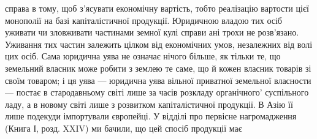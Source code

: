 справа в тому, щоб з’ясувати економічну вартість, тобто реалізацію вартости
цієї монополії на базі капіталістичної продукції. Юридичною владою тих осіб
уживати чи зловживати частинами земної кулі справи ані трохи не розв’язано.
Уживання тих частин залежить цілком від економічних умов, незалежних від
волі цих осіб. Сама юридична уява не означає нічого більше, як тільки те, що
земельний власник може робити з землею те саме, що й кожен власник
товарів зі своїм товаром; і ця уява — юридична уява вільної приватної земельної
власности — постає в стародавньому світі лише за часів розкладу органічного'
суспільного ладу, а в новому світі лише з розвитком капіталістичної продукції.
В Азію її лише подекуди імпортували європейці. У відділі про первісне нагромадження
(Книга І, розд. XXIV) ми бачили, що цей спосіб продукції має